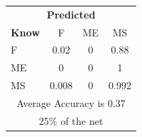 \documentclass[12pt]{article} %
\begin{document}
\begin{minipage}{0.5\textwidth}
\begin{center}
\begin{tabular}{l|c|c|c|}
 \multicolumn{4}{c}{ \textbf{ Predicted}}\\
 \textbf{Know}&F&ME&MS\\ \hline\hline
F   &0.02&0&0.88\\
ME &0&0&1\\
MS &0.008&0&0.992\\
\multicolumn{4}{c}{Average Accuracy is 0.37}\\
\multicolumn{4}{c}{25\%  of the net}\\
\end{tabular}
\end{center}
\end{minipage}
\end{document}
